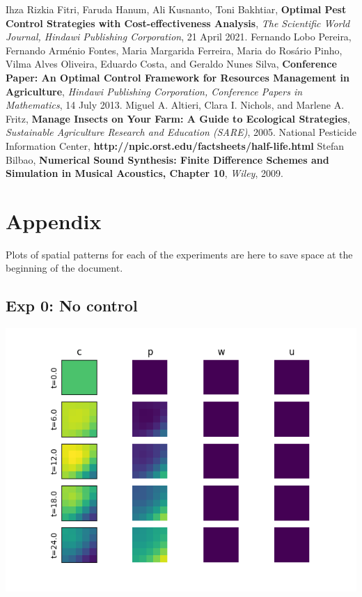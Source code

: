 \documentclass[11pt]{article}
\begin{document}

%
%

\begin{thebibliography}{1}
 Ihza Rizkia Fitri, Faruda Hanum, Ali Kusnanto, Toni Bakhtiar, \textbf{Optimal Pest Control Strategies with Cost-effectiveness Analysis}, \textit{The Scientific World Journal, Hindawi Publishing Corporation}, 21 April 2021.
 Fernando Lobo Pereira, Fernando Arménio Fontes, Maria Margarida Ferreira, 
Maria do Rosário Pinho, Vilma Alves Oliveira, Eduardo Costa, and Geraldo Nunes Silva, \textbf{Conference Paper: An Optimal Control Framework for Resources Management in Agriculture}, \textit{Hindawi Publishing Corporation, Conference Papers in Mathematics},  14 July 2013.
 Miguel A. Altieri, Clara I. Nichols, and Marlene A. Fritz, 
\textbf{Manage Insects on Your Farm: A Guide to Ecological Strategies},
\textit{Sustainable Agriculture Research and Education (SARE)}, 2005.
 National Pesticide Information Center, \textbf{http://npic.orst.edu/factsheets/half-life.html}
 Stefan Bilbao,
\textbf{Numerical Sound Synthesis: Finite Difference Schemes and Simulation in Musical Acoustics, Chapter 10},
\textit{Wiley}, 2009.
\end{thebibliography}


\section{Appendix}

Plots of spatial patterns for each of the experiments are here to save space at the beginning of the document.

\subsection{Exp 0: No control}

\begin{minipage}{\textwidth}
	\begin{center}
		\includegraphics[width=0.8\linewidth]{../sim_240604-091905/slices.png}
		\vspace{5pt}
	\end{center}
\end{minipage}
\end{document}
